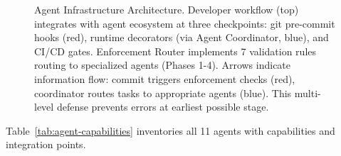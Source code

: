 \begin{figure}[htbp]
\caption{Agent Infrastructure Architecture. Developer workflow (top) integrates with agent ecosystem at three checkpoints: git pre-commit hooks (red), runtime decorators (via Agent Coordinator, blue), and CI/CD gates. Enforcement Router implements 7 validation rules routing to specialized agents (Phases 1-4). Arrows indicate information flow: commit triggers enforcement checks (red), coordinator routes tasks to appropriate agents (blue). This multi-level defense prevents errors at earliest possible stage.}
\label{fig:agent-architecture}
\end{figure}

Table~\ref{tab:agent-capabilities} inventories all 11 agents with capabilities and integration points.

